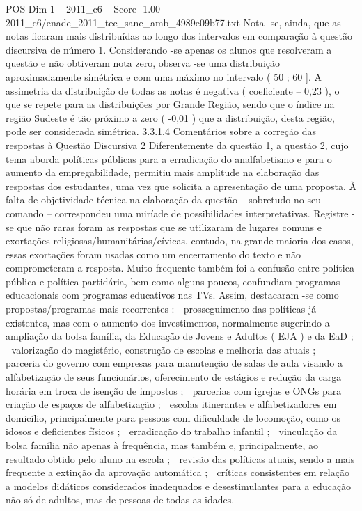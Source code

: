 \begin{textsample}{POS Dim 1 – 2011\_c6 – Score -1.00 – 2011\_c6/enade\_2011\_tec\_sane\_amb\_4989e09b77.txt}
Nota -se, ainda, que as notas ficaram mais distribuídas ao longo dos intervalos em comparação à questão discursiva de número 1.
Considerando -se apenas os alunos que resolveram a questão e não obtiveram nota zero, observa -se uma distribuição aproximadamente simétrica e com uma máximo no intervalo ( 50 ; 60 ].
A assimetria da distribuição de todas as notas é negativa ( coeficiente – 0,23 ), o que se repete para as distribuições por Grande Região, sendo que o índice na região Sudeste é tão próximo a zero ( -0,01 ) que a distribuição, desta região, pode ser considerada simétrica. 3.3.1.4 Comentários sobre a correção das respostas à Questão Discursiva 2 Diferentemente da questão 1, a questão 2, cujo tema aborda políticas públicas para a erradicação do analfabetismo e para o aumento da empregabilidade, permitiu mais amplitude na elaboração das respostas dos estudantes, uma vez que solicita a apresentação de uma proposta.
À falta de objetividade técnica na elaboração da questão – sobretudo no seu comando – correspondeu uma miríade de possibilidades interpretativas.
Registre -se que não raras foram as respostas que se utilizaram de lugares comuns e exortações religiosas/humanitárias/cívicas, contudo, na grande maioria dos casos, essas exortações foram usadas como um encerramento do texto e não comprometeram a resposta.
Muito frequente também foi a confusão entre política pública e política partidária, bem como alguns poucos, confundiam programas educacionais com programas educativos nas TVs.
Assim, destacaram -se como propostas/programas mais recorrentes :  prosseguimento das políticas já existentes, mas com o aumento dos investimentos, normalmente sugerindo a ampliação da bolsa família, da Educação de Jovens e Adultos ( EJA ) e da EaD ;  valorização do magistério, construção de escolas e melhoria das atuais ;  parceria do governo com empresas para manutenção de salas de aula visando a alfabetização de seus funcionários, oferecimento de estágios e redução da carga horária em troca de isenção de impostos ;  parcerias com igrejas e ONGs para criação de espaços de alfabetização ;  escolas itinerantes e alfabetizadores em domicílio, principalmente para pessoas com dificuldade de locomoção, como os idosos e deficientes físicos ;  erradicação do trabalho infantil ;  vinculação da bolsa família não apenas à frequência, mas também e, principalmente, ao resultado obtido pelo aluno na escola ;  revisão das políticas atuais, sendo a mais frequente a extinção da aprovação automática ;  críticas consistentes em relação a modelos didáticos considerados inadequados e desestimulantes para a educação não só de adultos, mas de pessoas de todas as idades.

\end{textsample}
